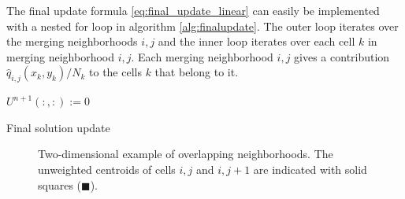 The final update formula \eqref{eq:final_update_linear} can easily be implemented with a 
nested for loop in algorithm \ref{alg:finalupdate}.  
The outer loop iterates over the merging neighborhoods $i,j$ and the inner loop 
iterates over each cell $k$ in merging neighborhood $i,j$.  Each merging 
neighborhood $i,j$ gives a contribution $ \hat{q}_{i,j}(x_{k}, y_k)/N_{k} $ to the 
cells $k$ that belong to it.

\begin{algorithm}[H]
\SetAlgoLined
$U^{n+1}(:,:) := 0$\\
 \caption{\sf Final solution update} \label{alg:finalupdate}
\end{algorithm}

\begin{figure}
	\hfill
	\caption{\sf Two-dimensional example of overlapping neighborhoods.  The unweighted centroids of cells $i,j$ and $i,j+1$ are indicated with solid squares ($\blacksquare$).} \label{fig:2nborTile}
\end{figure}

